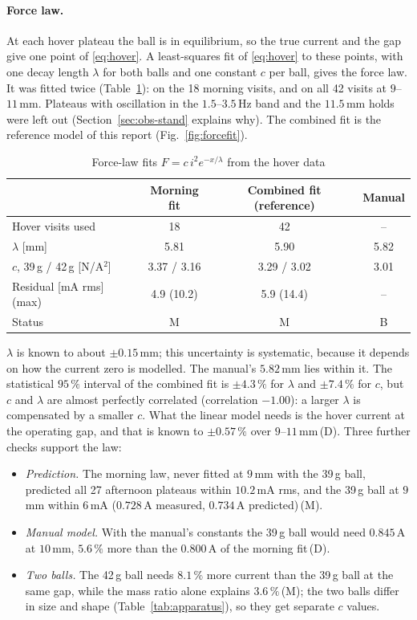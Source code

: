 \documentclass[11pt,a4paper]{article}
\newcommand{\st}[1]{\,\textup{(#1)}}
\begin{document}
\paragraph{Force law.} At each hover plateau the ball is in equilibrium, so the true current and the gap give one
point of \eqref{eq:hover}. A least-squares fit of \eqref{eq:hover} to these points, with one decay length $\lambda$ for both
balls and one constant $c$ per ball, gives the force law. It was fitted twice (Table~\ref{tab:forcefit}): on the 18
morning visits, and on all 42 visits at $9$--$11$\,mm. Plateaus with oscillation in the $1.5$--$3.5$\,Hz band
and the $11.5$\,mm holds were left out (Section~\ref{sec:obs-stand} explains why). The combined fit is the reference
model of this report (Fig.~\ref{fig:forcefit}).

\begin{table}[H]
\centering
\caption[Force-law fits]{Force-law fits $F = c\,i^2e^{-x/\lambda}$ from the hover data}
\label{tab:forcefit}
\begin{tabular}{@{}lccc@{}}
\toprule
 & Morning fit & Combined fit (reference) & Manual \\
\midrule
Hover visits used & 18 & 42 & -- \\
$\lambda$ [mm] & 5.81 & 5.90 & 5.82 \\
$c$, 39\,g / 42\,g [N/A$^2$] & 3.37 / 3.16 & 3.29 / 3.02 & 3.01 \\
Residual [mA rms] (max) & 4.9 (10.2) & 5.9 (14.4) & -- \\
Status & M & M & B \\
\bottomrule
\end{tabular}
\end{table}

$\lambda$ is known to about $\pm0.15$\,mm; this uncertainty is systematic, because it depends on how the current zero is
modelled. The manual's $5.82$\,mm lies within it. The statistical $95\,\%$ interval of the combined fit is $\pm4.3\,\%$ for
$\lambda$ and $\pm7.4\,\%$ for $c$, but $c$ and $\lambda$ are almost perfectly correlated (correlation $-1.00$): a larger
$\lambda$ is compensated by a smaller $c$. What the linear model needs is the hover current at the operating gap, and that
is known to $\pm0.57\,\%$ over $9$--$11$\,mm\st{D}. Three further checks support the law:
\begin{itemize}
\item \emph{Prediction.} The morning law, never fitted at $9$\,mm with the 39\,g ball, predicted all 27 afternoon plateaus
      within $10.2$\,mA rms, and the 39\,g ball at $9$\,mm within $6$\,mA ($0.728$\,A measured, $0.734$\,A predicted)\st{M}.
\item \emph{Manual model.} With the manual's constants the 39\,g ball would need $0.845$\,A at $10$\,mm, $5.6\,\%$ more than
      the $0.800$\,A of the morning fit\st{D}.
\item \emph{Two balls.} The 42\,g ball needs $8.1\,\%$ more current than the 39\,g ball at the same gap, while the mass ratio
      alone explains $3.6\,\%$\st{M}; the two balls differ in size and shape (Table~\ref{tab:apparatus}), so they get separate
      $c$ values.
\end{itemize}
\end{document}
